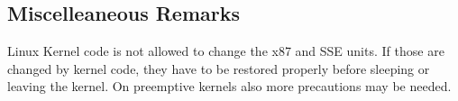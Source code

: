 \subsection{Miscelleaneous Remarks}

Linux Kernel code is not allowed to change the x87 and SSE units.  If
those are changed by kernel code, they have to be restored properly
before sleeping or leaving the kernel.  On preemptive kernels also
more precautions may be needed.


